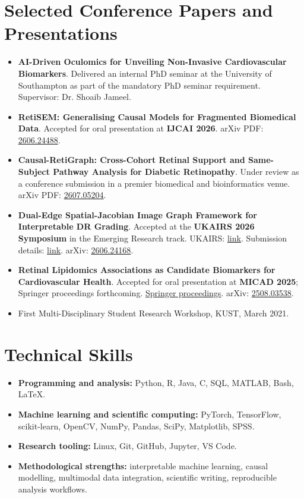 \documentclass[11pt,a4paper]{article}
\begin{document}
\section*{Selected Conference Papers and Presentations}
\begin{itemize}
  \item \textbf{AI-Driven Oculomics for Unveiling Non-Invasive Cardiovascular Biomarkers}. Delivered an internal PhD seminar at the University of Southampton as part of the mandatory PhD seminar requirement. Supervisor: Dr. Shoaib Jameel.
  \item \textbf{RetiSEM: Generalising Causal Models for Fragmented Biomedical Data}. Accepted for oral presentation at \textbf{IJCAI 2026}. arXiv PDF: \href{https://arxiv.org/pdf/2606.24488}{2606.24488}.
  \item \textbf{Causal-RetiGraph: Cross-Cohort Retinal Support and Same-Subject Pathway Analysis for Diabetic Retinopathy}. Under review as a conference submission in a premier biomedical and bioinformatics venue. arXiv PDF: \href{https://arxiv.org/pdf/2607.05204}{2607.05204}.
  \item \textbf{Dual-Edge Spatial-Jacobian Image Graph Framework for Interpretable DR Grading}. Accepted at the \textbf{UKAIRS 2026 Symposium} in the Emerging Research track. UKAIRS: \href{https://www.ukairs.ac.uk/Home/Welcome}{link}. Submission details: \href{https://www.ukairs.ac.uk/MyPapers/Details/13301}{link}. arXiv: \href{https://doi.org/10.48550/arXiv.2606.24168}{2606.24168}.
  \item \textbf{Retinal Lipidomics Associations as Candidate Biomarkers for Cardiovascular Health}. Accepted for oral presentation at \textbf{MICAD 2025}; Springer proceedings forthcoming. \href{https://link.springer.com/book/9789819574247}{Springer proceedings}. arXiv: \href{https://arxiv.org/abs/2508.03538}{2508.03538}.
  \item First Multi-Disciplinary Student Research Workshop, KUST, March 2021.
\end{itemize}

\section*{Technical Skills}
\begin{itemize}
  \item \textbf{Programming and analysis:} Python, R, Java, C, SQL, MATLAB, Bash, LaTeX.
  \item \textbf{Machine learning and scientific computing:} PyTorch, TensorFlow, scikit-learn, OpenCV, NumPy, Pandas, SciPy, Matplotlib, SPSS.
  \item \textbf{Research tooling:} Linux, Git, GitHub, Jupyter, VS Code.
  \item \textbf{Methodological strengths:} interpretable machine learning, causal modelling, multimodal data integration, scientific writing, reproducible analysis workflows.
\end{itemize}
\end{document}
